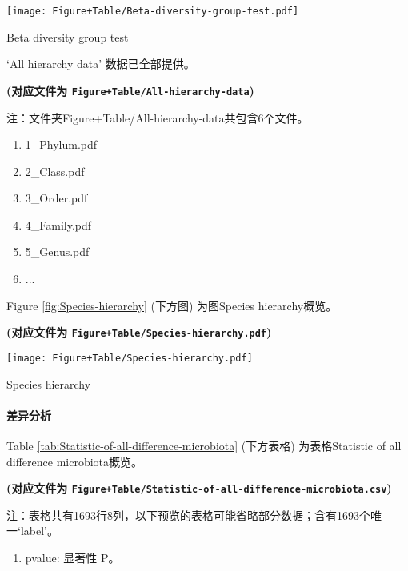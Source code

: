 \documentclass[
]{article}
\providecommand{\tightlist}{%
  \setlength{\itemsep}{0pt}\setlength{\parskip}{0pt}}
\begin{document}
\def\@captype{figure}
\begin{center}
\texttt{[image: Figure+Table/Beta-diversity-group-test.pdf]}
\caption{Beta diversity group test}\label{fig:Beta-diversity-group-test}
\end{center}

`All hierarchy data' 数据已全部提供。

\textbf{(对应文件为 \texttt{Figure+Table/All-hierarchy-data})}

\begin{center}\begin{tcolorbox}[colback=gray!10, colframe=gray!50, width=0.9\linewidth, arc=1mm, boxrule=0.5pt]注：文件夹Figure+Table/All-hierarchy-data共包含6个文件。

\begin{enumerate}\tightlist
\item 1\_Phylum.pdf
\item 2\_Class.pdf
\item 3\_Order.pdf
\item 4\_Family.pdf
\item 5\_Genus.pdf
\item ...
\end{enumerate}\end{tcolorbox}
\end{center}

Figure \ref{fig:Species-hierarchy} (下方图) 为图Species hierarchy概览。

\textbf{(对应文件为 \texttt{Figure+Table/Species-hierarchy.pdf})}

\def\@captype{figure}
\begin{center}
\texttt{[image: Figure+Table/Species-hierarchy.pdf]}
\caption{Species hierarchy}\label{fig:Species-hierarchy}
\end{center}

\hypertarget{diff}{%
\paragraph{差异分析}\label{diff}}

Table \ref{tab:Statistic-of-all-difference-microbiota} (下方表格) 为表格Statistic of all difference microbiota概览。

\textbf{(对应文件为 \texttt{Figure+Table/Statistic-of-all-difference-microbiota.csv})}

\begin{center}\begin{tcolorbox}[colback=gray!10, colframe=gray!50, width=0.9\linewidth, arc=1mm, boxrule=0.5pt]注：表格共有1693行8列，以下预览的表格可能省略部分数据；含有1693个唯一`label'。
\end{tcolorbox}
\end{center}
\begin{center}\begin{tcolorbox}[colback=gray!10, colframe=gray!50, width=0.9\linewidth, arc=1mm, boxrule=0.5pt]\begin{enumerate}\tightlist
\item pvalue:  显著性 P。
\end{enumerate}\end{tcolorbox}
\end{center}
\end{document}
